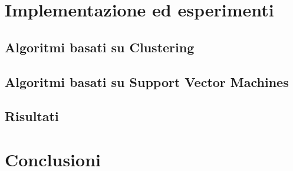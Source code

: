 \documentclass[oneside, openany]{book}
\begin{document}
	\chapter{Implementazione ed esperimenti}
	\section{Algoritmi basati su Clustering}
	\section{Algoritmi basati su Support Vector Machines}
	\section{Risultati}
	\chapter*{Conclusioni}
	{}
\end{document}
